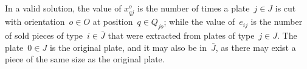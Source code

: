 \documentclass[ppgc,tese,english,formais,babel]{iiufrgs}
\makeatletter
\newcommand{\specialcell}[1]{\ifmeasuring@#1\else\omit$\displaystyle#1$\ignorespaces\fi}
\makeatother
\begin{document}
In a valid solution, the value of \(x^o_{qj}\) is the number of times a plate~\(j \in J\) is cut with orientation~\(o \in O\) at position~\(q \in Q_{jo}\); while the value of~\(e_{ij}\) is the number of sold pieces of type~\(i \in \bar{J}\) that were extracted from plates of type~\(j \in J\).
The plate~\(0 \in J\) is the original plate, and it may also be in~\(\bar{J}\), as there may exist a piece of the same size as the original plate.

\end{document}
